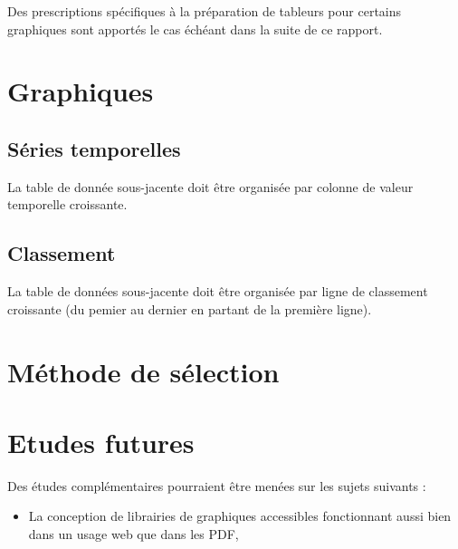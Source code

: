 \documentclass[11pt]{article}
\begin{document}
Des prescriptions spécifiques à la préparation de tableurs pour certains graphiques sont apportés le cas échéant dans la suite de ce rapport.
\section{Graphiques}
\label{sec:org94822d2}
\subsection{Séries temporelles}
\label{sec:org3bd2fe6}
La table de donnée sous-jacente doit être organisée par colonne de valeur temporelle croissante.
\subsection{Classement}
\label{sec:orgc0f4006}
La table de données sous-jacente doit être organisée par ligne de classement croissante (du pemier au dernier en partant de la première ligne).
\section{Méthode de sélection}
\label{sec:orgf850443}

\section{Etudes futures}
\label{sec:org9f876d8}
Des études complémentaires pourraient être menées sur les sujets suivants :
\begin{itemize}
\item La conception de librairies de graphiques accessibles fonctionnant aussi bien dans un usage web que dans les PDF,
\end{itemize}
\end{document}
